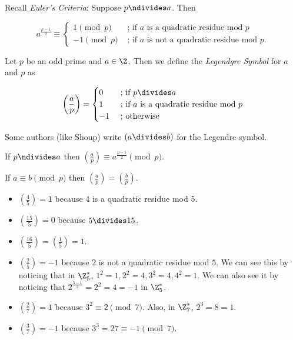 \documentclass[oneside,12pt]{amsart}
\begin{document}
\bigskip

Recall \emph{Euler's Criteria}: Suppose $p \ndivides a$. Then

$$
a^{\frac{p-1}{2}} \equiv
\begin{cases}
1 \pmod p &\text{ ; if } a \text{ is a quadratic residue mod } p \\
-1 \pmod p &\text{ ; if } a \text{ is not a quadratic residue mod } p.
\end{cases}
$$


\begin{definition} Let $p$ be an odd prime and $a\in\Z$. Then we define the \emph{Legendgre Symbol} for $a$ and $p$ as

$$
\left( \frac{a}{p} \right) =
\begin{cases}
0  &\text{ ; if } p\divides a \\
1  &\text{ ; if } a \text{ is a quadratic residue mod } p \\
-1   &\text{ ; otherwise } \\
\end{cases}
$$

Some authors (like Shoup) write $(a \divides b)$ for the Legendre symbol.

\end{definition}

\begin{note}
If $p\ndivides a$ then $\left( \frac{a}{p} \right) \equiv a^{\frac{p-1}{2}} \pmod p$.
\end{note}

\begin{note}
If $a\equiv b \pmod p$ then $\left( \frac{a}{p} \right)=\left( \frac{b}{p} \right)$.
\end{note}

\begin{example}
\begin{itemize}
\item $\left( \frac{4}{5} \right) = 1$ because $4$ is a quadratic residue mod $5$.
\item $\left( \frac{15}{5} \right) = 0$ because $5\divides 15$.
\item $\left( \frac{16}{5} \right) = \left( \frac{1}{5} \right)= 1$.
\item $\left( \frac{2}{5} \right) = -1$ because $2$ is not a quadratic residue mod $5$. We can see this by noticing that in $\Z^*_5$,
$1^2=1, 2^2=4, 3^2=4, 4^2=1$. We can also see it by noticing that $2^{\frac{5-1}{2}}=2^2=4=-1$ in $\Z^*_5$.
\item $\left( \frac{2}{7} \right)=1$ because $3^2\equiv 2 \pmod 7$. Also, in $\Z^*_7$, $2^3=8=1$.
\item $\left( \frac{3}{7} \right) = -1$ because $3^3=27\equiv -1 \pmod 7$.
\end{itemize}
\end{example}
\end{document}
